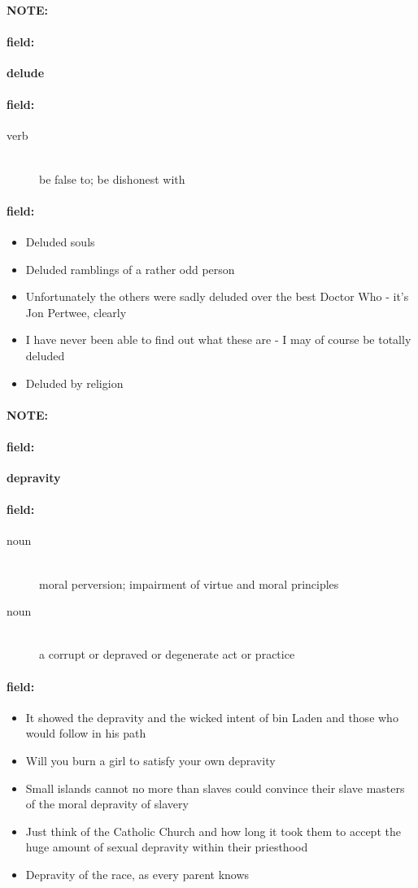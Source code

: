 \documentclass[12pt]{article}
\newenvironment{note}{\paragraph{NOTE:}}{}
\newenvironment{field}{\paragraph{field:}}{}
\begin{document}
\begin{note}
\begin{field}
\textbf{\large delude}
\end{field}


\begin{field}
\begin{description}
\item[verb] \hfill \\ 
be false to; be dishonest with

\end{description}
\end{field}

\begin{field}
\begin{itemize}
\item Deluded souls
\item Deluded ramblings of a rather odd person
\item Unfortunately the others were sadly deluded over the best Doctor Who - it's Jon Pertwee, clearly
\item I have never been able to find out what these are - I may of course be totally deluded
\item Deluded by religion
\end{itemize}
\end{field}
\end{note}
\begin{note}
\begin{field}
\textbf{\large depravity}
\end{field}


\begin{field}
\begin{description}
\item[noun] \hfill \\ 
moral perversion; impairment of virtue and moral principles

\item[noun] \hfill \\ 
a corrupt or depraved or degenerate act or practice

\end{description}
\end{field}

\begin{field}
\begin{itemize}
\item It showed the depravity and the wicked intent of bin Laden and those who would follow in his path
\item Will you burn a girl to satisfy your own depravity
\item Small islands cannot  no more than slaves could convince their slave masters of the moral depravity of slavery
\item Just think of the Catholic Church and how long it took them to accept the huge amount of sexual depravity within their priesthood
\item Depravity of the race, as every parent knows
\end{itemize}
\end{field}
\end{note}
\end{document}
